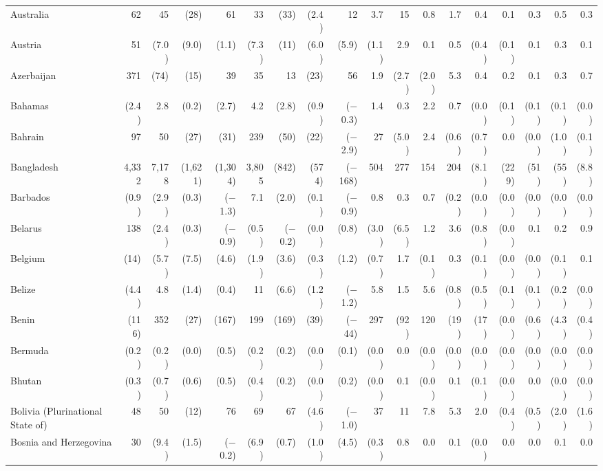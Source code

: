 \begin{longtable}{lrrrrrrrrrrrrrrrrr}
Australia & 62 & 45 & (28) & 61 & 33 & (33) & (2.4) & 12 & 3.7 & 15 & 0.8 & 1.7 & 0.4 & 0.1 & 0.3 & 0.5 & 0.3 \\
Austria & 51 & (7.0) & (9.0) & (1.1) & (7.3) & (11) & (6.0) & (5.9) & (1.1) & 2.9 & 0.1 & 0.5 & (0.4) & (0.1) & 0.1 & 0.3 & 0.1 \\
Azerbaijan & 371 & (74) & (15) & 39 & 35 & 13 & (23) & 56 & 1.9 & (2.7) & (2.0) & 5.3 & 0.4 & 0.2 & 0.1 & 0.3 & 0.7 \\
Bahamas & (2.4) & 2.8 & (0.2) & (2.7) & 4.2 & (2.8) & (0.9) & ($-$0.3) & 1.4 & 0.3 & 2.2 & 0.7 & (0.0) & (0.1) & (0.1) & (0.1) & (0.0) \\
Bahrain & 97 & 50 & (27) & (31) & 239 & (50) & (22) & ($-$2.9) & 27 & (5.0) & 2.4 & (0.6) & (0.7) & 0.0 & (0.0) & (1.0) & (0.1) \\
Bangladesh & 4,332 & 7,178 & (1,621) & (1,304) & 3,805 & (842) & (574) & ($-$168) & 504 & 277 & 154 & 204 & (8.1) & (229) & (51) & (55) & (8.8) \\
Barbados & (0.9) & (2.9) & (0.3) & ($-$1.3) & 7.1 & (2.0) & (0.1) & ($-$0.9) & 0.8 & 0.3 & 0.7 & (0.2) & (0.0) & (0.0) & (0.0) & (0.0) & (0.0) \\
Belarus & 138 & (2.4) & (0.3) & ($-$0.9) & (0.5) & ($-$0.2) & (0.0) & (0.8) & (3.0) & (6.5) & 1.2 & 3.6 & (0.8) & (0.0) & 0.1 & 0.2 & 0.9 \\
Belgium & (14) & (5.7) & (7.5) & (4.6) & (1.9) & (3.6) & (0.3) & (1.2) & (0.7) & 1.7 & (0.1) & 0.3 & (0.1) & (0.0) & (0.0) & (0.1) & 0.1 \\
Belize & (4.4) & 4.8 & (1.4) & (0.4) & 11 & (6.6) & (1.2) & ($-$1.2) & 5.8 & 1.5 & 5.6 & (0.8) & (0.5) & (0.1) & (0.1) & (0.2) & (0.0) \\
Benin & (116) & 352 & (27) & (167) & 199 & (169) & (39) & ($-$44) & 297 & (92) & 120 & (19) & (17) & (0.0) & (0.6) & (4.3) & (0.4) \\
Bermuda & (0.2) & (0.2) & (0.0) & (0.5) & (0.2) & (0.2) & (0.0) & (0.1) & (0.0) & 0.0 & (0.0) & (0.0) & (0.0) & (0.0) & (0.0) & (0.0) & (0.0) \\
Bhutan & (0.3) & (0.7) & (0.6) & (0.5) & (0.4) & (0.2) & (0.0) & (0.2) & (0.0) & 0.1 & (0.0) & 0.1 & (0.1) & (0.0) & 0.0 & (0.0) & (0.0) \\
Bolivia (Plurinational State of) & 48 & 50 & (12) & 76 & 69 & 67 & (4.6) & ($-$1.0) & 37 & 11 & 7.8 & 5.3 & 2.0 & (0.4) & (0.5) & (2.0) & (1.6) \\
Bosnia and Herzegovina & 30 & (9.4) & (1.5) & ($-$0.2) & (6.9) & (0.7) & (1.0) & (4.5) & (0.3) & 0.8 & 0.0 & 0.1 & (0.0) & 0.0 & 0.0 & 0.1 & 0.0 \\

\end{longtable}
